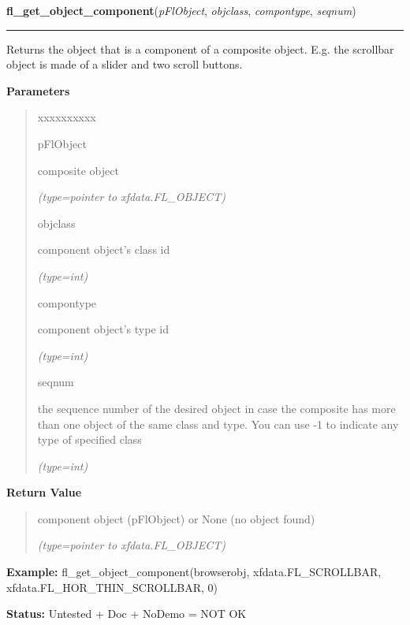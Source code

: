 \hspace{.8\funcindent}\begin{boxedminipage}{\funcwidth}

    \raggedright \textbf{fl\_get\_object\_component}(\textit{pFlObject}, \textit{objclass}, \textit{compontype}, \textit{seqnum})

    \vspace{-1.5ex}

    \rule{\textwidth}{0.5\fboxrule}
\setlength{\parskip}{2ex}
    Returns the object that is a component of a composite object. E.g. the 
    scrollbar object is made of a slider and two scroll buttons.

\setlength{\parskip}{1ex}
      \textbf{Parameters}
      \vspace{-1ex}

      \begin{quote}
        \begin{Ventry}{xxxxxxxxxx}

          \item[pFlObject]

          composite object

            {\it (type=pointer to xfdata.FL\_OBJECT)}

          \item[objclass]

          component object's class id

            {\it (type=int)}

          \item[compontype]

          component object's type id

            {\it (type=int)}

          \item[seqnum]

          the sequence number of the desired object in case the composite 
          has more than one object of the same class and type. You can use 
          -1 to indicate any type of specified class

            {\it (type=int)}

        \end{Ventry}

      \end{quote}

      \textbf{Return Value}
    \vspace{-1ex}

      \begin{quote}
      component object (pFlObject) or None (no object found)

      {\it (type=pointer to xfdata.FL\_OBJECT)}

      \end{quote}

\textbf{Example:} fl\_get\_object\_component(browserobj, xfdata.FL\_SCROLLBAR, 
xfdata.FL\_HOR\_THIN\_SCROLLBAR, 0)



\textbf{Status:} Untested + Doc + NoDemo = NOT OK



    \end{boxedminipage}

